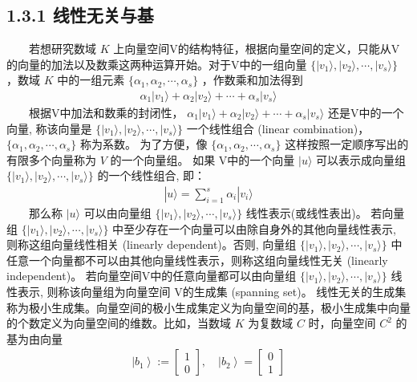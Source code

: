 \documentclass[a4paper,11pt,english]{sphinxmanual}
\begin{document}
\subsection{1.3.1 线性无关与基}
\label{\detokenize{rst/_u9644_u5f551_u91cf_u5b50_u8ba1_u7b97_u6570_u5b66_u57fa_u78402:id2}}
\sphinxAtStartPar
​  若想研究数域 \(K\) 上向量空间V的结构特征，根据向量空间的定义，只能从V的向量的加法以及数乘这两种运算开始。对于V中的一组向量  \(\{|v_{1}\rangle,|v_{2}\rangle, \cdots,|v_{s}\rangle\}\) ，数域 \(K\) 中的一组元素  \(\{\alpha_{1}, \alpha_{2}, \cdots, \alpha_{s}\}\) ，作数乘和加法得到
\begin{equation*}
\begin{split}\alpha_{1}|v_{1}\rangle+\alpha_{2}|v_{2}\rangle+\cdots+\alpha_{s}|v_{s}\rangle\end{split}
\end{equation*}
\sphinxAtStartPar
​  根据V中加法和数乘的封闭性，  \(\alpha_{1}|v_{1}\rangle+\alpha_{2}|v_{2}\rangle+\cdots+\alpha_{s}|v_{s}\rangle\) 还是V中的一个向量, 称该向量是  \(\{|v_{1}\rangle,|v_{2}\rangle, \cdots,|v_{s}\rangle\}\) 一个线性组合 (linear combination)，  \(\{\alpha_{1}, \alpha_{2}, \cdots, \alpha_{s}\}\) 称为系数。 为了方便，像  \(\{\alpha_{1}, \alpha_{2}, \cdots, \alpha_{s}\}\) 这样按照一定顺序写出的有限多个向量称为  \(V\) 的一个向量组。 如果 V中的一个向量  \(| {u}\rangle\) 可以表示成向量组  \(\{|v_{1}\rangle,|v_{2}\rangle, \cdots,|v_{s}\rangle\}\) 的一个线性组合, 即：
\begin{equation*}
\begin{split}|u\rangle=\sum_{i=1}^{s} \alpha_{i}|v_{i}\rangle\end{split}
\end{equation*}
\sphinxAtStartPar
​  那么称  \(| {u}\rangle\) 可以由向量组  \(\{|v_{1}\rangle,|v_{2}\rangle, \cdots,|v_{s}\rangle\}\) 线性表示(或线性表出)。 若向量组  \(\{|v_{1}\rangle,|v_{2}\rangle, \cdots,|v_{s}\rangle\}\) 中至少存在一个向量可以由除自身外的其他向量线性表示, 则称这组向量线性相关 (linearly dependent)。否则, 向量组  \(\{|v_{1}\rangle,|v_{2}\rangle, \cdots,|v_{s}\rangle\}\) 中任意一个向量都不可以由其他向量线性表示，则称这组向量线性无关 (linearly independent)。 若向量空间V中的任意向量都可以由向量组  \(\{|v_{1}\rangle,|v_{2}\rangle, \cdots,|v_{s}\rangle\}\) 线性表示, 则称该向量组为向量空间 V的生成集 (spanning set)。 线性无关的生成集称为极小生成集。向量空间的极小生成集定义为向量空间的基，极小生成集中向量的个数定义为向量空间的维数。比如，当数域  \(K\) 为复数域   \(C\) 时，向量空间  \(C^{2}\) 的基为由向量
\begin{equation*}
\begin{split}\left|b_{1}\right\rangle:=\left[\begin{array}{l} 1 \\ 0 \end{array}\right], \quad\left|b_{2}\right\rangle=\left[\begin{array}{l} 0 \\ 1 \end{array}\right]\end{split}
\end{equation*}
\end{document}
